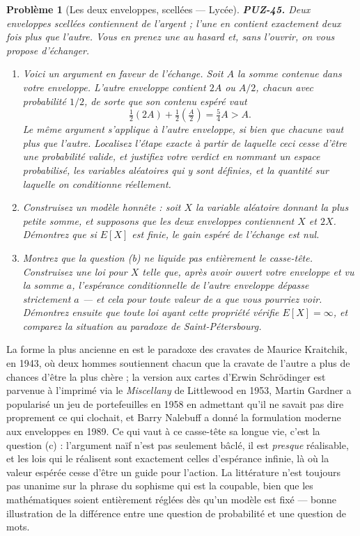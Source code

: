 \documentclass[11pt]{article}
\newtheorem{problem}{Problème}
\begin{document}
\begin{problem}[{Les deux enveloppes, scellées --- Lycée}]
\textbf{PUZ-45.} Deux enveloppes scellées contiennent de l'argent ; l'une en contient
exactement deux fois plus que l'autre. Vous en prenez une au hasard et, sans l'ouvrir, on
vous propose d'échanger.
\begin{enumerate}
\item[(a)] Voici un argument en faveur de l'échange. Soit $ A $ la somme contenue dans votre
enveloppe. L'autre enveloppe contient $ 2A $ ou $ A/2 $, chacun avec probabilité
$ 1/2 $, de sorte que son contenu espéré vaut
\[ \tfrac{1}{2}(2A) + \tfrac{1}{2}\!\left(\tfrac{A}{2}\right) = \tfrac{5}{4}A > A . \]
Le même argument s'applique à l'autre enveloppe, si bien que chacune vaut plus que l'autre.
Localisez l'étape exacte à partir de laquelle ceci cesse d'être une probabilité valide, et
justifiez votre verdict en nommant un espace probabilisé, les variables aléatoires qui y
sont définies, et la quantité sur laquelle on conditionne réellement.
\item[(b)] Construisez un modèle honnête : soit $ X $ la variable aléatoire donnant la plus
petite somme, et supposons que les deux enveloppes contiennent $ X $ et $ 2X $.
Démontrez que si $ E[X] $ est finie, le gain espéré de l'échange est nul.
\item[(c)] Montrez que la question (b) ne liquide pas entièrement le casse-tête. Construisez une
loi pour $ X $ telle que, après avoir ouvert votre enveloppe et vu la somme $ a $,
l'espérance conditionnelle de l'autre enveloppe dépasse strictement $ a $ --- et cela pour
toute valeur de $ a $ que vous pourriez voir. Démontrez ensuite que toute loi ayant cette
propriété vérifie $ E[X] = \infty $, et comparez la situation au paradoxe de
Saint-Pétersbourg.
\end{enumerate}

\end{problem}

\noindent La forme la plus ancienne en est le paradoxe des cravates de Maurice
Kraitchik, en 1943, où deux hommes soutiennent chacun que la cravate de l'autre a plus de
chances d'être la plus chère ; la version aux cartes d'Erwin Schrödinger est parvenue à
l'imprimé via le \textit{Miscellany} de Littlewood en 1953, Martin Gardner a popularisé un jeu
de portefeuilles en 1958 en admettant qu'il ne savait pas dire proprement ce qui clochait,
et Barry Nalebuff a donné la formulation moderne aux enveloppes en 1989. Ce qui vaut à ce
casse-tête sa longue vie, c'est la question (c) : l'argument naïf n'est pas seulement
bâclé, il est \textit{presque} réalisable, et les lois qui le réalisent sont exactement celles
d'espérance infinie, là où la valeur espérée cesse d'être un guide pour l'action. La
littérature n'est toujours pas unanime sur la phrase du sophisme qui est la coupable, bien
que les mathématiques soient entièrement réglées dès qu'un modèle est fixé --- bonne
illustration de la différence entre une question de probabilité et une question de
mots.
\end{document}
